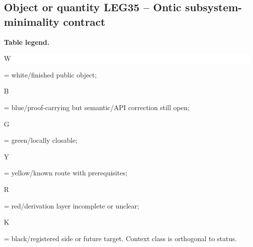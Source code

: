 \subsection*{Object or quantity LEG35 -- Ontic subsystem-minimality contract}
\hypertarget{objproof:LEG35}{}
\par\smallskip\noindent\begin{minipage}{0.99\linewidth}\footnotesize\raggedright\textbf{Table legend.} \colorbox{white}{\strut W} = white/finished public object; \colorbox{cyan!20}{\strut B} = blue/proof-carrying but semantic/API correction still open; \colorbox{green!18}{\strut G} = green/locally closable; \colorbox{yellow!25}{\strut Y} = yellow/known route with prerequisites; \colorbox{red!20}{\strut R} = red/derivation layer incomplete or unclear; \colorbox{black!18}{\strut K} = black/registered side or future target. Context class is orthogonal to status.\end{minipage}\par\vspace{0.25em}
